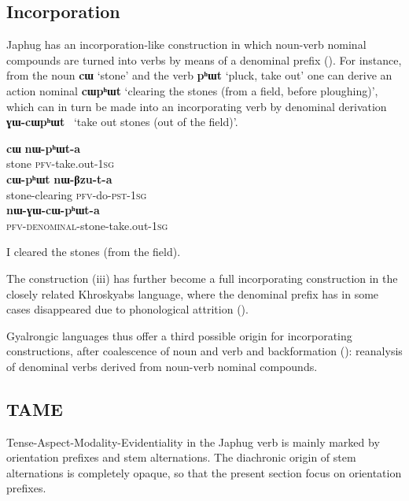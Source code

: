 \documentclass[oldfontcommands,oneside,a4paper,11pt]{article}
\newcommand{\ipa}[1]{\mbox{\phon\textbf{#1}}} %
\begin{document}
\subsection{Incorporation} \label{sec:incorp}
Japhug has an incorporation-like construction in which noun-verb nominal compounds are turned into verbs by means of a denominal prefix (\citealt{jacques12incorp}). For instance, from the noun \ipa{cɯ} `stone' and the verb \ipa{pʰɯt} `pluck, take out' one can derive an action nominal   \ipa{cɯpʰɯt} `clearing the stones (from a field, before ploughing)', which can in turn be made into an incorporating verb by denominal derivation  \ipa{ɣɯ-cɯpʰɯt } `take out stones (out of the field)'. 

\begin{exe}   
\ex
\begin{xlist}[(ii)]
\gll     \ipa{cɯ} \ipa{nɯ-pʰɯt-a}  \\
  stone \textsc{pfv}-take.out-\textsc{1sg} \\
\gll     \ipa{cɯ-pʰɯt} \ipa{nɯ-βzu-t-a}  \\
  stone-clearing \textsc{pfv}-do-\textsc{pst}-\textsc{1sg} \\
\gll     \ipa{nɯ-ɣɯ-cɯ-pʰɯt-a}  \\
  \textsc{pfv-denominal}-stone-take.out-\textsc{1sg} \\
  \end{xlist}
  \glt   I cleared the stones (from the field). 
\end{exe}   

The construction (iii) has further become a full incorporating construction in the closely related Khroskyabs language, where the denominal prefix has in some cases disappeared due to phonological attrition (\citealt{lai13affixale}).

Gyalrongic languages thus offer a third possible origin for incorporating constructions, after coalescence of noun and verb and backformation (\citealt{mithun84incorp}): reanalysis of denominal verbs derived from noun-verb nominal compounds.


\subsection{TAME}
Tense-Aspect-Modality-Evidentiality in the Japhug verb is mainly marked by orientation prefixes and stem alternations. The diachronic origin of stem alternations is completely opaque, so that the present section focus on orientation prefixes. 
\end{document}
